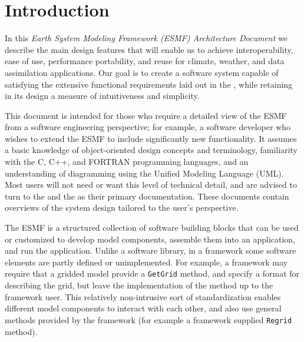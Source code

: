 \section{Introduction}
\label{sec:intro}

In this {\it Earth System Modeling Framework (ESMF) Architecture Document} we describe 
the main design features that will enable us to achieve interoperability, ease of 
use, performance portability, and reuse for climate, weather, and data assimilation
applications.  Our goal is to create a software system capable of satisfying
the extensive functional requirements laid out in the  
\cite{bib:ESMFreqdoc}, while retaining in its design a measure of intuitiveness 
and simplicity. 

This document is intended for those who require a detailed view of the ESMF
from a software engineering perspective; for example, a software developer who
wishes to extend the ESMF to include significantly new functionality.  It assumes 
a basic knowledge of object-oriented design concepts and terminology, familiarity 
with the C, C++, and FORTRAN programming languages, and an understanding of 
diagramming using the Unified Modeling Language (UML).  Most users will 
not need or want this level of technical detail, and are advised to turn to 
the 
and the 
as their primary documentation.  These documents contain overviews of the system 
design tailored to the user's perspective.

The ESMF is a structured collection of software building blocks 
that can be used or customized to develop model components, assemble them into an 
application, and run the application.  Unlike a software library, in a framework some
software elements are partly defined or unimplemented.  For example, a framework
may require that a gridded model provide a {\tt GetGrid} method, and specify 
a format for describing the grid, but leave the implementation of the method up
to the framework user.  This relatively non-intrusive sort of standardization enables 
different model components to interact with each other, and also
use general methods provided by the framework (for example a framework supplied
{\tt Regrid} method).

